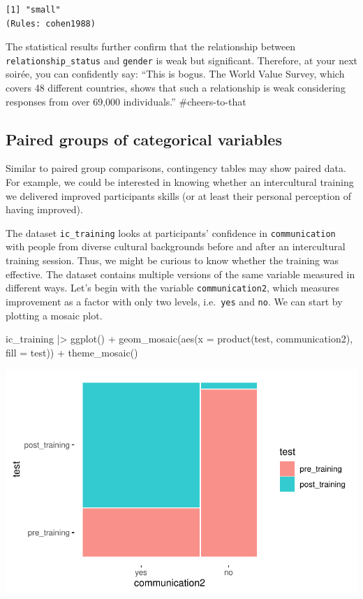 \documentclass[
  letterpaper,
  DIV=11,
  numbers=noendperiod]{scrreprt}
\newenvironment{Shaded}{\begin{snugshade}}{\end{snugshade}}
\newcommand{\AttributeTok}[1]{\textcolor[rgb]{0.40,0.45,0.13}{#1}}
\newcommand{\FunctionTok}[1]{\textcolor[rgb]{0.28,0.35,0.67}{#1}}
\newcommand{\NormalTok}[1]{\textcolor[rgb]{0.00,0.23,0.31}{#1}}
\newcommand{\SpecialCharTok}[1]{\textcolor[rgb]{0.37,0.37,0.37}{#1}}
\begin{document}
\begin{verbatim}
[1] "small"
(Rules: cohen1988)
\end{verbatim}

The statistical results further confirm that the relationship between
\texttt{relationship\_status} and \texttt{gender} is weak but
significant. Therefore, at your next soirée, you can confidently say:
``This is bogus. The World Value Survey, which covers 48 different
countries, shows that such a relationship is weak considering responses
from over 69,000 individuals.'' \#cheers-to-that

\subsection{Paired groups of categorical
variables}\label{sec-paired-groups-categorical-variables}

Similar to paired group comparisons, contingency tables may show paired
data. For example, we could be interested in knowing whether an
intercultural training we delivered improved participants skills (or at
least their personal perception of having improved).

The dataset \texttt{ic\_training} looks at participants' confidence in
\texttt{communication} with people from diverse cultural backgrounds
before and after an intercultural training session. Thus, we might be
curious to know whether the training was effective. The dataset contains
multiple versions of the same variable measured in different ways. Let's
begin with the variable \texttt{communication2}, which measures
improvement as a factor with only two levels, i.e.~\texttt{yes} and
\texttt{no}. We can start by plotting a mosaic plot.

\begin{Shaded}
\begin{Highlighting}[]
\NormalTok{ic\_training }\SpecialCharTok{|\textgreater{}}
  \FunctionTok{ggplot}\NormalTok{() }\SpecialCharTok{+}
  \FunctionTok{geom\_mosaic}\NormalTok{(}\FunctionTok{aes}\NormalTok{(}\AttributeTok{x =} \FunctionTok{product}\NormalTok{(test, communication2),}
                  \AttributeTok{fill =}\NormalTok{ test)) }\SpecialCharTok{+}
  \FunctionTok{theme\_mosaic}\NormalTok{()}
\end{Highlighting}
\end{Shaded}

\includegraphics{11_group_comparison_files/figure-pdf/mosaic-plot-test-communication-two-by-two-1.pdf}
\end{document}
